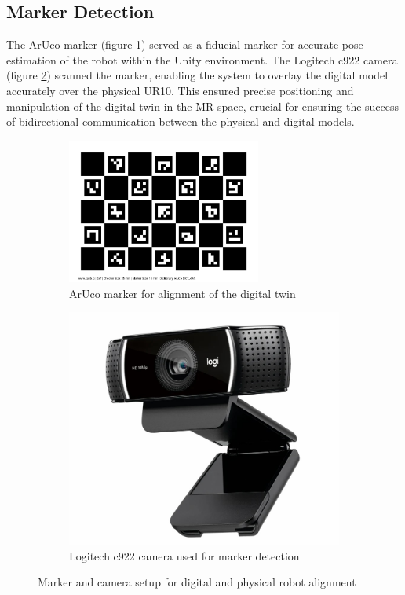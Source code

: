 \subsection{Marker Detection}
The ArUco marker (figure \ref{f:aruco_marker}) served as a fiducial marker for accurate pose estimation of the robot within the Unity environment. The Logitech c922 camera (figure \ref{fig:camera-c922}) scanned the marker, enabling the system to overlay the digital model accurately over the physical UR10. This ensured precise positioning and manipulation of the digital twin in the MR space, crucial for ensuring the success of bidirectional communication between the physical and digital models.

\begin{figure}[h]
    \centering
    \begin{subfigure}[b]{0.45\textwidth}
    \centering
    \includegraphics[width=0.7\textwidth]{figs/calib_io_charuco_200x150_5x7_25_18_DICT_4X4.png}
    \caption{ArUco marker for alignment of the digital twin}
    \label{f:aruco_marker}
    \end{subfigure}
        \hfill
    \begin{subfigure}[b]{0.45\textwidth}
        \centering
        \includegraphics[width=0.7\linewidth]{figs/camera-c922.jpg}
        \caption{Logitech c922 camera used for marker detection}
        \label{fig:camera-c922}
    \end{subfigure}
    \caption{Marker and camera setup for digital and physical robot alignment}
\label{marker-camera}
\end{figure}

